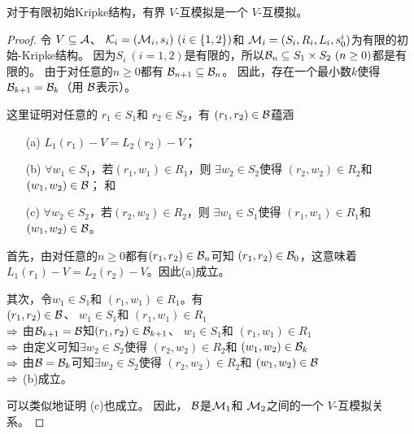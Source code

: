 \begin{lemma} \label{lem:HbBis}
	对于有限初始Kripke结构，有界 $V$-互模拟是一个 $V$-互模拟。
\end{lemma}

\begin{proof}
	令 $V \subseteq {\cal A}$、 ${\cal K}_i=({\cal M}_i,s_i)~(i\in\{1,2\})$和 ${\cal M}_i=(S_i, R_i,L_i, s_0^i)$为有限的初始-Kripke结构。
	因为$S_i~(i=1,2)$是有限的，所以${\cal B}_n\subseteq S_1\times S_2~(n\ge 0)$都是有限的。
	由于对任意的$n\geq 0$都有 ${\cal B}_{n+1} \subseteq {\cal B}_n$。
	因此，存在一个最小数$k$使得
	${\cal B}_{k+1} ={\cal B}_k$（用 ${\cal B}$表示）。
	
	
	这里证明对任意的 $r_1\in S_1$和 $r_2 \in S_2$，有 $(r_1, r_2)\in {\cal B}$蕴涵 %
	\begin{itemize}
		\item[(a)] $L_1(r_1)-V = L_2(r_2)-V$；
		\item[(b)] $\forall w_1\in S_1$，若$(r_1, w_1)\in R_1$，则 $\exists w_2 \in S_2$使得 $(r_2,w_2) \in R_2$和 $(w_1, w_2) \in {\cal B}$； 和
		\item[(c)] $\forall w_2\in S_2$，若$(r_2, w_2)\in R_2$，则 $\exists w_1 \in S_1$使得 $(r_1,w_1) \in R_1$和 $(w_1, w_2)\in {\cal B} $。
	\end{itemize}
	
	首先，由对任意的$n\ge 0$都有$(r_1, r_2)\in {\cal B}_n$可知 $(r_1, r_2) \in {\cal B}_0$，这意味着
	$L_1(r_1)-V = L_2(r_2)-V$。因此(a)成立。
	
	其次，令$w_1 \in S_1$和 $(r_1, w_1)\in R_1$。有 \\
	$(r_1,r_2)\in {\cal B}$、 $w_1 \in S_1$和 $(r_1, w_1)\in R_1$\\
	$\Rightarrow$ 由${\cal B}_{k+1}={\cal B}$知$(r_1,r_2)\in {\cal B}_{k+1}$、 $w_1 \in S_1$和 $(r_1, w_1)\in R_1$\\
	$\Rightarrow$ 由定义可知$\exists w_2\in S_2$使得 $(r_2, w_2)\in R_2$和 $(w_1,w_2)\in {\cal B}_k$\\
	$\Rightarrow$ 由${\cal B}={\cal B}_k$可知$\exists w_2\in S_2$使得 $(r_2, w_2)\in R_2$和 $(w_1,w_2)\in {\cal B}$\\
	$\Rightarrow$ (b)成立。
	
	可以类似地证明 (c)也成立。
	因此， ${\cal B}$是${\cal M}_1$和 ${\cal M}_2$之间的一个 $V$-互模拟关系。
\end{proof}

